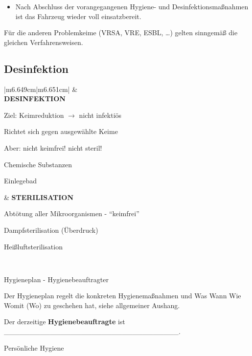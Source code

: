 \documentclass{article}
\newcommand\gEs[1]{\textbf{\textcolor[rgb]{0.0,0.0,0.5019608}{#1}}}
\newcommand\gEs[1]{\textbf{\textcolor[rgb]{0.0,0.0,0.5019608}{#1}}}
\newcommand\gT[1]{\textbf{\textup{\textcolor[rgb]{0.0,0.5019608,0.0}{#1}}}}
\begin{document}
\begin{itemize}
\item {\mdseries
Nach Abschluss der vorangegangenen Hygiene- und
Desinfektionsma{\ss}nahmen ist das Fahrzeug wieder voll einsatzbereit.}

\end{itemize}
{\mdseries
F\"ur die anderen Problemkeime (VRSA, VRE, ESBL, {\dots}) gelten
sinngem\"a{\ss} die gleichen Verfahrensweisen. }

\subsection[Desinfektion]{Desinfektion}
\begin{center}
\tablehead{}\begin{supertabular}{|m{6.649cm}|m{6.651cm}|}
\hline
 &
\\\hline
{\mdseries \gT{DESINFEKTION}}

{\mdseries Ziel: Keimreduktion ${\rightarrow}$ nicht infekti\"os}

{\mdseries Richtet sich gegen ausgew\"ahlte Keime}

{\mdseries Aber: nicht keimfrei! nicht steril!}

{\mdseries Chemische Substanzen}

{\mdseries Einlegebad}

 &
{\mdseries \gT{STERILISATION}}

{\mdseries Abt\"otung aller Mikroorganismen -
{\textquotedblleft}keimfrei{\textquotedblright}}

{\mdseries Dampfsterilisation (\"Uberdruck)}

{\mdseries Hei{\ss}luftsterilisation}

\\\hline
\end{supertabular}
\end{center}
{\mdseries\color{black}
Hygieneplan - Hygienebeauftragter}

{\mdseries
Der Hygieneplan regelt die konkreten Hygienema{\ss}nahmen und Was Wann
Wie Womit (Wo) zu geschehen hat, siehe allgemeiner Aushang.}

{\mdseries
Der derzeitige \gEs{Hygienebeauftragte} ist
\_\_\_\_\_\_\_\_\_\_\_\_\_\_\_\_\_\_\_\_\_\_\_\_\_\_\_\_\_\_\_\_\_\_.}

{\mdseries\color[rgb]{0.0,0.0,0.5019608}
Pers\"onliche Hygiene}
\end{document}
